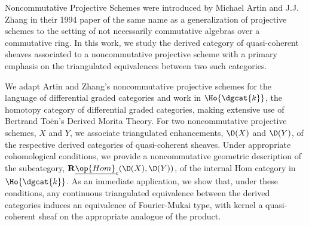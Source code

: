 Noncommutative Projective Schemes were introduced by Michael Artin and J.J. Zhang in their 1994 paper of the same name as a generalization of projective schemes to the setting of not necessarily commutative algebras over a commutative ring.
In this work, we study the derived category of quasi-coherent sheaves associated to a noncommutative projective scheme with a primary emphasis on the triangulated equivalences between two such categories.

We adapt Artin and Zhang's noncommutative projective schemes for the language of differential graded categories and work in \(\Ho{\dgcat{k}}\), the homotopy category of differential graded categories, making extensive use of Bertrand To\"en's Derived Morita Theory.
For two noncommutative projective schemes, \(X\) and \(Y\), we associate triangulated enhancements, \(\D(X)\) and \(\D(Y)\), of the respective derived categories of quasi-coherent sheaves.
Under appropriate cohomological conditions, we provide a noncommutative geometric description of the subcategory, \(\mathbf{R}\underline{\op{Hom}}_c(\D(X), \D(Y))\), of the internal Hom category in \(\Ho{\dgcat{k}}\).
As an immediate application, we show that, under these conditions, any continuous triangulated equivalence between the derived categories induces an equivalence of Fourier-Mukai type, with kernel a quasi-coherent sheaf on the appropriate analogue of the product.
